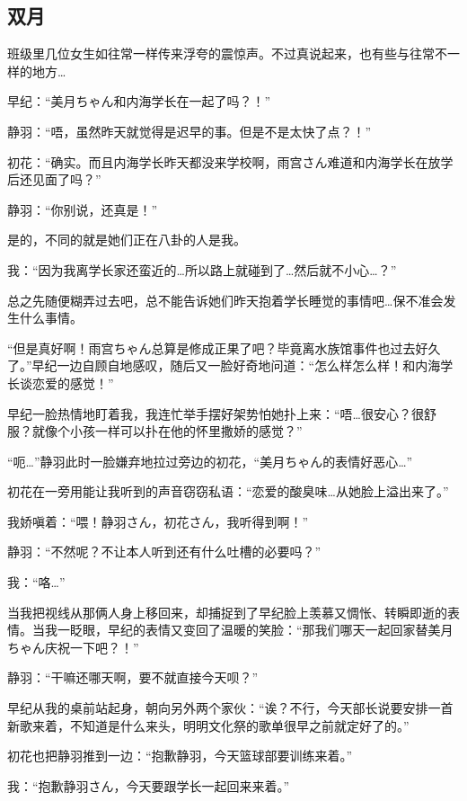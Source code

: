 \newpage
\newday{\sunny}
\subsection{双月}

{\fillf{}\fillf{}}

班级里几位女生如往常一样传来浮夸的震惊声。不过真说起来，也有些与往常不一样的地方…

早纪：“美月ちゃん和内海学长在一起了吗？！”

静羽：“唔，虽然昨天就觉得是迟早的事。但是不是太快了点？！”

初花：“确实。而且内海学长昨天都没来学校啊，雨宫さん难道和内海学长在放学后还见面了吗？”

静羽：“你别说，还真是！”

是的，不同的就是她们正在八卦的人是我。

我：“因为我离学长家还蛮近的…所以路上就碰到了…然后就不小心…？”

总之先随便糊弄过去吧，总不能告诉她们昨天抱着学长睡觉的事情吧…保不准会发生什么事情。

“但是真好啊！雨宫ちゃん总算是修成正果了吧？毕竟离水族馆事件也过去好久了。”早纪一边自顾自地感叹，随后又一脸好奇地问道：“怎么样怎么样！和内海学长谈恋爱的感觉！”

早纪一脸热情地盯着我，我连忙举手摆好架势怕她扑上来：“唔…很安心？很舒服？就像个小孩一样可以扑在他的怀里撒娇的感觉？”

“呃…”静羽此时一脸嫌弃地拉过旁边的初花，“美月ちゃん的表情好恶心…”

初花在一旁用能让我听到的声音窃窃私语：“恋爱的酸臭味…从她脸上溢出来了。”

我娇嗔着：“喂！静羽さん，初花さん，我听得到啊！”

静羽：“不然呢？不让本人听到还有什么吐槽的必要吗？”

我：“咯…”

当我把视线从那俩人身上移回来，却捕捉到了早纪脸上羡慕又惆怅、转瞬即逝的表情。当我一眨眼，早纪的表情又变回了温暖的笑脸：“那我们哪天一起回家替美月ちゃん庆祝一下吧？！”

静羽：“干嘛还哪天啊，要不就直接今天呗？”

早纪从我的桌前站起身，朝向另外两个家伙：“诶？不行，今天部长说要安排一首新歌来着，不知道是什么来头，明明文化祭的歌单很早之前就定好了的。”

初花也把静羽推到一边：“抱歉静羽，今天篮球部要训练来着。”

我：“抱歉静羽さん，今天要跟学长一起回来来着。”

